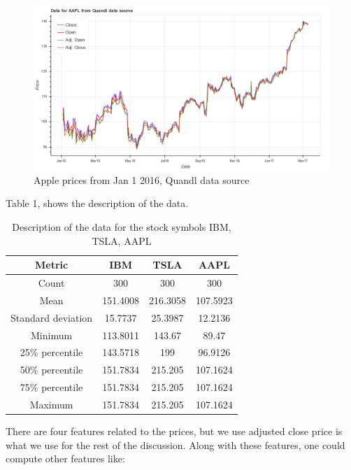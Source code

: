 \documentclass[12pt]{article}
\begin{document}
\begin{figure}[!htbp]
\label{fig:aapl}
\begin{center}
\includegraphics[height=0.5\textheight,width=\textwidth]{price_plot_AAPL.png}
\caption{Apple prices from Jan 1 2016, Quandl data source}
\end{center}
\end{figure}

Table 1, shows the description of the data.
\begin{table}
\begin{center}
\begin{tabular} {|c|c|c|c|}
\hline \hline
\textbf{Metric} & \textbf{IBM} & \textbf{TSLA} & \textbf{AAPL} \\ \hline
Count & 300 & 300 & 300 \\ \hline
Mean & 151.4008 & 216.3058 & 107.5923\\ \hline
Standard deviation   & 15.7737 & 25.3987&12.2136  \\ \hline
Minimum & 113.8011 & 143.67 & 89.47 \\ \hline
25\% percentile & 143.5718 & 199 & 96.9126 \\ \hline
50\% percentile  & 151.7834 & 215.205 & 107.1624\\ \hline
75\% percentile  & 151.7834 & 215.205 & 107.1624 \\ \hline
Maximum  &  151.7834 & 215.205 & 107.1624\\ \hline
\hline
\end{tabular}
\end{center}
\caption{Description of the data for the stock symbols IBM, TSLA, AAPL}
\end{table}


There are four features related to the prices, but we use adjusted close price is what we use for the rest of the discussion. Along with these features, one could compute other features like:
\end{document}
